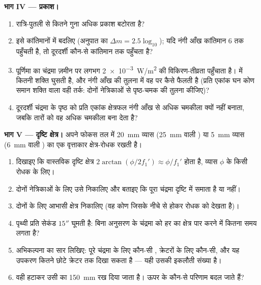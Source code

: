 \begin{problem}
\medskip
\noindent\textbf{भाग IV --- प्रकाश।}
\begin{enumerate}[resume]
  \item {} रात्रि-पुतली से कितने गुना अधिक प्रकाश बटोरता है?
  \item इसे कांतिमानों में बदलिए (अनुपात का $\Delta m = 2.5\log_{10}$);
        यदि नंगी आँख कांतिमान $6$ तक पहुँचती है, तो दूरदर्शी कौन-से
        कांतिमान तक पहुँचता है?
  \item पूर्णिमा का चंद्रमा ज़मीन पर लगभग
        \qty{2e-3}{W/m^2} की विकिरण-तीव्रता पहुँचाता है।  में
        कितनी शक्ति घुसती है, और नंगी आँख की तुलना में वह  पर
        कैसे फैलती है (प्रति एकांक घन कोण समान शक्ति वाला वही तर्क: दोनों
        नेत्रिकाओं से पृष्ठ-चमक की तुलना कीजिए)?
  \item दूरदर्शी चंद्रमा के पृष्ठ को प्रति एकांक क्षेत्रफल नंगी आँख से
        अधिक चमकीला क्यों नहीं बनाता, जबकि तारों को वह अधिक चमकीला बना
        देता है?
\end{enumerate}

\medskip
\noindent\textbf{भाग V --- दृष्टि क्षेत्र।}
 अपने फोकस तल में \qty{20}{mm} व्यास (\qty{25}{mm} वाली ) या
\qty{5}{mm} व्यास (\qty{6}{mm} वाली ) का एक वृत्ताकार क्षेत्र-रोधक
रखती है।
\begin{enumerate}[resume]
  \item दिखाइए कि वास्तविक दृष्टि क्षेत्र $2\arctan(\phi/2f_1')
        \approx \phi/f_1'$ होता है, व्यास $\phi$ के किसी रोधक के लिए।
  \item दोनों नेत्रिकाओं के लिए उसे निकालिए और बताइए कि पूरा चंद्रमा
        दृष्टि में समाता है या नहीं।
  \item दोनों के लिए आभासी क्षेत्र निकालिए (वह कोण जिसके नीचे 
         से होकर रोधक को देखता है)।
  \item पृथ्वी प्रति सेकंड $15''$ घूमती है: बिना अनुसरण के चंद्रमा को हर
         का क्षेत्र पार करने में कितना समय लगता है?
  \item अभिकल्पना का सार लिखिए: पूरे चंद्रमा के लिए कौन-सी , क्रेटरों
        के लिए कौन-सी, और यह उपकरण कितने छोटे क्रेटर तक दिखा सकता है ---
        यही उसकी इकलौती संख्या है।
  \item वही  हटाकर उसी  का \qty{150}{mm}  रख
        दिया जाता है। ऊपर के कौन-से परिणाम बदल जाते हैं?
\end{enumerate}
\end{problem}
